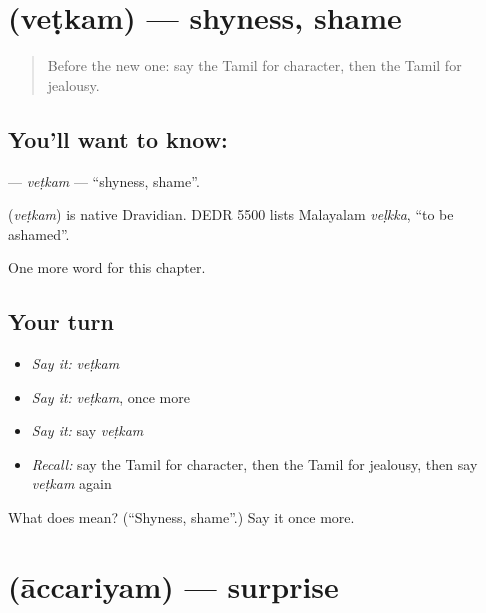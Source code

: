 \section[\texorpdfstring{\ta{வெட்கம்} (veṭkam)}{வெட்கம் (veṭkam)}]{ (veṭkam) — shyness, shame}

\label{lesson:TA-C210-vetkam}



\begin{quote}
Before the new one: say the Tamil for character, then the Tamil for jealousy.
\end{quote}

\subsection*{You'll want to know: }
\textbf{} — \emph{veṭkam} — \textquotedblleft{}shyness, shame\textquotedblright{}.

\begin{cousinweb}
\textbf{} (\emph{veṭkam}) is native Dravidian. DEDR 5500 lists Malayalam \emph{veḷkka}, \textquotedblleft{}to be ashamed\textquotedblright{}.
\end{cousinweb}

\begin{grammarlens}[title={What you've built}]
One more word for this chapter.
\end{grammarlens}

\subsection*{Your turn}
\begin{itemize}
\raggedright
  \item \emph{Say it:} \emph{veṭkam}
  \item \emph{Say it:} \emph{veṭkam}, once more
  \item \emph{Say it:} say \emph{veṭkam}
  \item \emph{Recall:} say the Tamil for character, then the Tamil for jealousy, then say \emph{veṭkam} again
\end{itemize}

\begin{tcolorbox}[breakable,colback=teal!4,colframe=teal!35!black,title={Before you move on}]
What does  mean? (\textquotedblleft{}Shyness, shame\textquotedblright{}.) Say it once more.
\end{tcolorbox}
\section[\texorpdfstring{\ta{ஆச்சரியம்} (āccariyam)}{ஆச்சரியம் (āccariyam)}]{ (āccariyam) — surprise}


